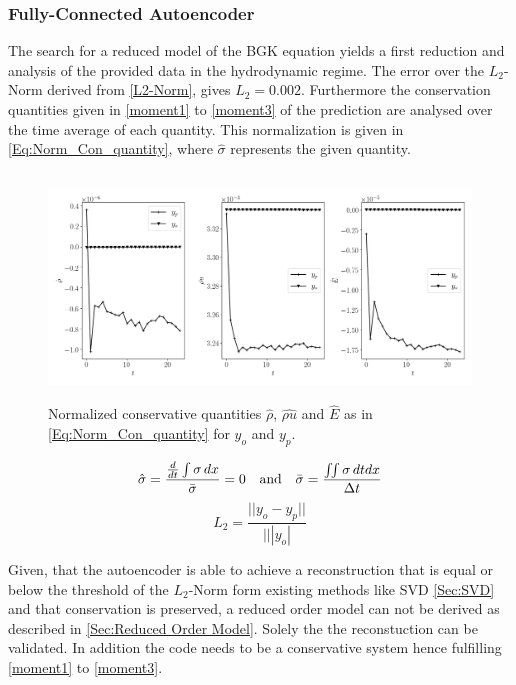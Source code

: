 \documentclass[12pt, a4paper]{article}
\begin{document}
\subsubsection{Fully-Connected Autoencoder}
The search for a reduced model of the BGK equation yields a first reduction and analysis of the provided data in the hydrodynamic regime. The error over the $L_2$-Norm derived from \cref{L2-Norm}, gives $L_2 = 0.002$. Furthermore the conservation quantities given in \cref{moment1} to \cref{moment3} of the prediction are analysed over the time average of each quantity. This normalization is given in \cref{Eq:Norm_Con_quantity}, where $\hat{\sigma}$ represents the given quantity. 
\begin{figure}[!htbp]
	\includegraphics[width=\linewidth,height=6cm]{Figures/02_12_20/kn0p00001Conservative_Quantities/together/all_together.png}
	\caption{Normalized conservative quantities $\hat{\rho}$, $\hat{\rho u}$ and $\hat{E}$ as in \cref{Eq:Norm_Con_quantity} for $y_o$ and $y_p$.}
\end{figure}
\begin{multicols}{2}	
	\begin{equation}
	\hat{\sigma} = \frac{\frac{d}{dt} \int \sigma \,dx}{\bar{\sigma}} = 0 \quad\textrm{and}\quad \bar{\sigma} = \frac{\iint \sigma \,dtdx}{\Delta t}\label{Eq:Norm_Con_quantity}\\
	\end{equation}\break
	\begin{equation}
		L_2 = \frac{||y_o - y_p||}{|||y_o|} \label{L2-Norm}
	\end{equation}
\end{multicols}
Given, that the autoencoder is able to achieve a reconstruction that is equal or below the threshold of the $L_2$-Norm form existing methods like SVD \cref{Sec:SVD} and that conservation is preserved, a reduced order model can not be derived as described in \cref{Sec:Reduced Order Model}. Solely the the reconstuction can be validated. In addition the code needs to be a conservative system hence fulfilling \cref{moment1} to \cref{moment3}.
\end{document}
